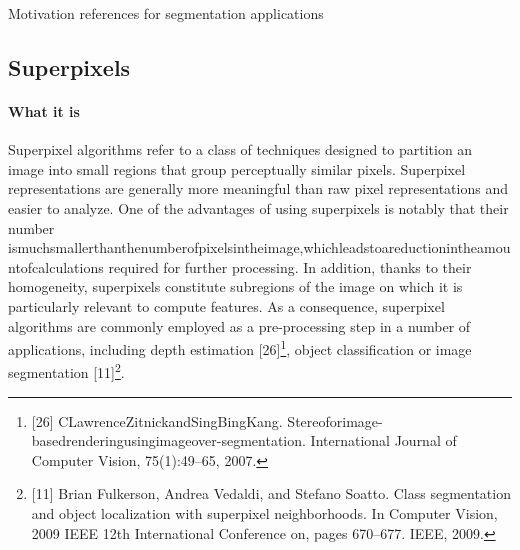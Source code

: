 \documentclass{article}
\begin{document}
            Motivation references for segmentation applications

    \subsection{Superpixels}
            \paragraph{What it is}Superpixel algorithms refer to a class of techniques designed to partition an image into small regions that group perceptually similar pixels. Superpixel representations are generally more meaningful than raw pixel representations and easier to analyze. One of the advantages of using superpixels is notably that their number ismuchsmallerthanthenumberofpixelsintheimage,whichleadstoareductionintheamountofcalculations required for further processing. In addition, thanks to their homogeneity, superpixels constitute subregions of the image on which it is particularly relevant to compute features. As a consequence, superpixel algorithms are commonly employed as a pre-processing step in a number of applications, including depth estimation [26]\footnote{[26] CLawrenceZitnickandSingBingKang. Stereoforimage-basedrenderingusingimageover-segmentation. International Journal of Computer Vision, 75(1):49–65, 2007.}, object classification or image segmentation [11]\footnote{[11] Brian Fulkerson, Andrea Vedaldi, and Stefano Soatto. Class segmentation and object localization with superpixel neighborhoods. In Computer Vision, 2009 IEEE 12th International Conference on, pages 670–677. IEEE, 2009.}.
\end{document}
